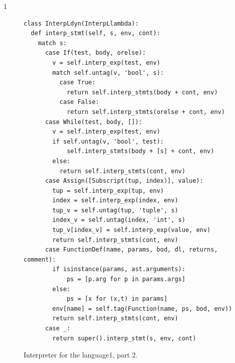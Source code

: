 \documentclass[7x10]{TimesAPriori_MIT}%
\def\pythonEd{1}
\def\edition{1}
\newcommand{\pythonColor}[0]{}
\newcommand{\python}[1]{{\if\edition\pythonEd\pythonColor #1\fi}}
\numberwithin{theorem}{chapter}
\numberwithin{definition}{chapter}
\numberwithin{equation}{chapter}
\begin{document}
{\if\edition\pythonEd\pythonColor
  \begin{figure}[tbp]
\begin{tcolorbox}[colback=white]    
\begin{lstlisting}[basicstyle=\ttfamily\footnotesize]
class InterpLdyn(InterpLlambda):
  def interp_stmt(self, s, env, cont):
    match s:
      case If(test, body, orelse):
        v = self.interp_exp(test, env)
        match self.untag(v, 'bool', s):
          case True:
            return self.interp_stmts(body + cont, env)
          case False:
            return self.interp_stmts(orelse + cont, env)
      case While(test, body, []):
        v = self.interp_exp(test, env)
        if self.untag(v, 'bool', test):
            self.interp_stmts(body + [s] + cont, env)
        else:
          return self.interp_stmts(cont, env)
      case Assign([Subscript(tup, index)], value):
        tup = self.interp_exp(tup, env)
        index = self.interp_exp(index, env)
        tup_v = self.untag(tup, 'tuple', s)
        index_v = self.untag(index, 'int', s)
        tup_v[index_v] = self.interp_exp(value, env)
        return self.interp_stmts(cont, env)
      case FunctionDef(name, params, bod, dl, returns, comment):
        if isinstance(params, ast.arguments):
            ps = [p.arg for p in params.args]
        else:
            ps = [x for (x,t) in params]
        env[name] = self.tag(Function(name, ps, bod, env))
        return self.interp_stmts(cont, env)
      case _:
        return super().interp_stmt(s, env, cont)
\end{lstlisting}
\end{tcolorbox}

\caption{Interpreter for the \LangDyn{} language\python{, part 2}.}
\label{fig:interp-Ldyn-2}
\end{figure}
\fi}
\end{document}
